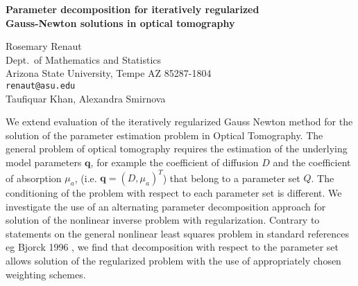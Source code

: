 \documentclass{report}
\begin{document}

\begin{center}
{\large
{\bf Parameter decomposition for iteratively regularized \\
	Gauss-Newton solutions in optical tomography}}

	Rosemary Renaut \\
	Dept.~of Mathematics and Statistics \\
	Arizona State University,  Tempe AZ 85287-1804 \\
	{\tt renaut@asu.edu} \\
	Taufiquar Khan, Alexandra Smirnova
\end{center}
We extend evaluation of the iteratively regularized Gauss
Newton method for the solution of the parameter estimation
problem in Optical Tomography. The general problem of
optical tomography requires the estimation of the underlying
model parameters ${\mathbf q}$, for example the coefficient
of diffusion $D$ and the coefficient of absorption $\mu_a$,
(i.e. ${\mathbf q}=(D,\mu_a)^T$) that belong to a parameter
set $Q$. The conditioning of the problem with respect to
each parameter set is different. We investigate the use of
an alternating parameter decomposition approach for solution
of the nonlinear inverse problem with regularization.
Contrary to statements on the general nonlinear least
squares problem in standard references eg Bjorck 1996 , we
find that decomposition with respect to the parameter set
allows solution of the regularized problem with the use of
appropriately chosen weighting schemes.



\end{document}
